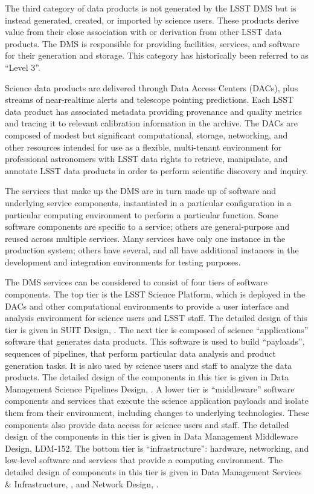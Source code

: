 \documentclass[DM,lsstdraft,toc]{lsstdoc}
\begin{document}
The third category of data products is not generated by the LSST DMS but
is instead generated, created, or imported by science users. These
products derive value from their close association with or derivation
from other LSST data products. The DMS is responsible for providing
facilities, services, and software for their generation and storage.
This category has historically been referred to as ``Level 3''.

Science data products are delivered through Data Access Centers (DACs),
plus streams of near-realtime alerts and telescope pointing predictions.
Each LSST data product has associated metadata providing provenance and
quality metrics and tracing it to relevant calibration information in
the archive. The DACs are composed of modest but significant
computational, storage, networking, and other resources intended for use
as a flexible, multi-tenant environment for professional astronomers
with LSST data rights to retrieve, manipulate, and annotate LSST data
products in order to perform scientific discovery and inquiry.

The services that make up the DMS are in turn made up of software and
underlying service components, instantiated in a particular
configuration in a particular computing environment to perform a
particular function. Some software components are specific to a service;
others are general-purpose and reused across multiple services. Many
services have only one instance in the production system; others have
several, and all have additional instances in the development and
integration environments for testing purposes.

The DMS services can be considered to consist of four tiers of software
components. The top tier is the LSST Science Platform, which is deployed
in the DACs and other computational environments to provide a user
interface and analysis environment for science users and LSST staff. The
detailed design of this tier is given in SUIT Design, . The next
tier is composed of science ``applications'' software that generates
data products. This software is used to build ``payloads'', sequences of
pipelines, that perform particular data analysis and product generation
tasks. It is also used by science users and staff to analyze the data
products. The detailed design of the components in this tier is given in
Data Management Science Pipelines Design, . A lower tier is
``middleware'' software components and services that execute the science
application payloads and isolate them from their environment, including
changes to underlying technologies. These components also provide data
access for science users and staff. The detailed design of the
components in this tier is given in Data Management Middleware Design,
LDM-152. The bottom tier is ``infrastructure'': hardware, networking,
and low-level software and services that provide a computing
environment. The detailed design of components in this tier is given in
Data Management Services \& Infrastructure, , and Network Design,
.
\end{document}
